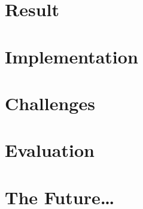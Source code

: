 \documentclass[12pt,a4paper,naustrian,english,oneside,openright,DIV=12,BCOR=1cm]{scrbook}
\begin{document}
\chapter{Result}
\def\kapitelautor{Christoph Führer}
\label{ch:mod:result}


\chapter{Implementation}
\label{ch:mod:implementation}


\chapter{Challenges}
\def\kapitelautor{Clemens Stadlbauer}
\label{ch:mod:challanges}


\chapter{Evaluation}
\def\kapitelautor{Julian Lorenz}
\label{ch:mod:evaluation}


\chapter{The Future\ldots}


\clearpage
\def\kapitelautor{}
\end{document}
